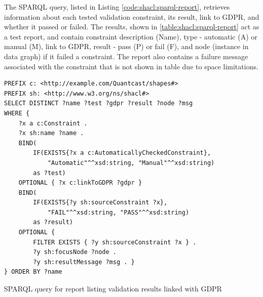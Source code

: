 The SPARQL query, listed in Listing \autoref{code:shacl:sparql-report}, retrieves information about each tested validation constraint, its result, link to GDPR, and whether it passed or failed.
The results, shown in \autoref{table:shacl:sparql-report} act as a test report, and contain constraint description (Name), type - automatic (A) or manual (M), link to GDPR, result - pass (P) or fail (F), and node (instance in data graph) if it failed a constraint.
The report also contains a failure message associated with the constraint that is not shown in table due to space limitations.
\begin{listing}[htbp]
\begin{verbatim}
PREFIX c: <http://example.com/Quantcast/shapes#>
PREFIX sh: <http://www.w3.org/ns/shacl#>
SELECT DISTINCT ?name ?test ?gdpr ?result ?node ?msg
WHERE {
    ?x a c:Constraint .
    ?x sh:name ?name .
    BIND(
        IF(EXISTS{?x a c:AutomaticallyCheckedConstraint},
            "Automatic"^^xsd:string, "Manual"^^xsd:string)
        as ?test)
    OPTIONAL { ?x c:linkToGDPR ?gdpr }
    BIND(
        IF(EXISTS{?y sh:sourceConstraint ?x},
            "FAIL"^^xsd:string, "PASS"^^xsd:string)
        as ?result)
    OPTIONAL {
        FILTER EXISTS { ?y sh:sourceConstraint ?x } .
        ?y sh:focusNode ?node .
    	?y sh:resultMessage ?msg . }
} ORDER BY ?name
\end{verbatim}
\caption{SPARQL query for report listing validation results linked with GDPR}
\label{code:shacl:sparql-report}
\end{listing}


